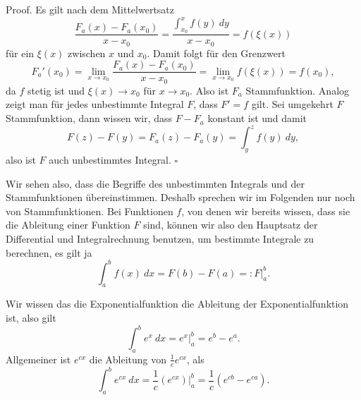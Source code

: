 \documentclass[letterpaper,10pt,english]{jupyterBook}
\begin{document}
\begin{emphBox}{}{}
Proof. Es gilt nach dem Mittelwertsatz
\begin{equation*}
 \frac{F_a(x)-F_a(x_0)}{x-x_0} = \frac{\int_{x_0}^x f(y)~dy }{x-x_0} = f(\xi(x))
\end{equation*}
für ein \(\xi(x)\) zwischen \(x\) und \(x_0\). Damit folgt für den Grenzwert
\begin{equation*}
 F_a'(x_0) = \lim_{x\rightarrow x_0}\frac{F_a(x)-F_a(x_0)}{x-x_0} =  \lim_{x\rightarrow x_0}f(\xi(x)) = f(x_0),
\end{equation*}
da \(f\) stetig ist und \(\xi(x) \rightarrow x_0\) für \(x \rightarrow x_0\). Also ist \(F_a\) Stammfunktion.
Analog zeigt man für jedes unbestimmte Integral \(F\), dass \(F'=f\) gilt.
Sei umgekehrt \(F\) Stammfunktion, dann wissen wir, dass \(F-F_a\) konstant ist und damit
\begin{equation*}
 F(z) - F(y) = F_a(z) - F_a(y) = \int_y^z f(y)~dy,
\end{equation*}
also ist \(F\) auch unbestimmtes Integral. \(\square\)
\end{emphBox}

Wir sehen also, dass die Begriffe des unbestimmten Integrals und der Stammfunktionen übereinstimmen. Deshalb sprechen wir im Folgenden nur noch von Stammfunktionen. Bei Funktionen \(f\), von denen wir bereits wissen, dass sie die Ableitung einer Funktion \(F\) sind, können wir also den Hauptsatz der Differential  und Integralrechnung benutzen, um bestimmte Integrale zu berechnen, es gilt ja
\begin{equation*}
 \int_a^b f(x)~dx = F(b) - F(a) =: F\vert_a^b.
\end{equation*}\label{integration/hdi:example-4}
\begin{example}{}{}



Wir wissen das die Exponentialfunktion die Ableitung der Exponentialfunktion ist, also gilt
\begin{equation*}
 \int_a^b e^x ~dx = e^x\vert_a^b = e^b -e^a.
\end{equation*}
Allgemeiner ist \(e^{cx}\) die Ableitung von \(\frac{1}c e^{cx}\), als
\begin{equation*}
 \int_a^b e^{cx} ~dx =\frac{1}c (e^{cx})\vert_a^b = \frac{1}c (e^{cb} -e^{ca}).
\end{equation*}\end{example}
\end{document}
